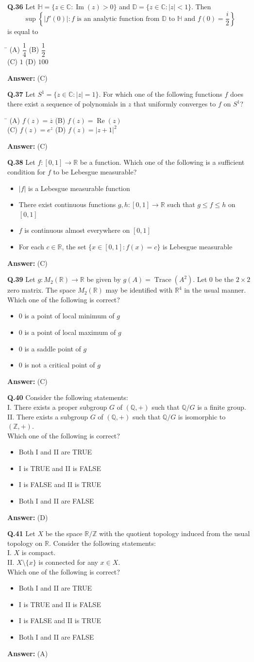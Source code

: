 \documentclass[11pt,a4paper]{article}
\newcommand{\optsfourA}[4]{%
  \begin{tabbing}
    \hspace{0.48\linewidth}\=\kill
    (A) #1 \> (B) #2 \\[2pt]
    (C) #3 \> (D) #4
  \end{tabbing}%
}
\newcommand{\optslistA}[4]{%
  \begin{itemize}
    \setlength{\itemsep}{2pt}\setlength{\parskip}{0pt}
    \item[(A)] #1
    \item[(B)] #2
    \item[(C)] #3
    \item[(D)] #4
  \end{itemize}%
}
\newcommand{\ans}[1]{\textbf{Answer:} #1\par\medskip}
\begin{document}
\textbf{Q.36} Let $\mathbb{H} = \{z \in \mathbb{C} : \operatorname{Im}(z) > 0\}$ and $\mathbb{D} = \{z \in \mathbb{C} : |z| < 1\}$. Then
\[
  \sup\left\{|f'(0)| : f \text{ is an analytic function from } \mathbb{D} \text{ to } \mathbb{H} \text{ and } f(0) = \frac{i}{2}\right\}
\]
is equal to
\optsfourA{$\dfrac{1}{4}$}{$\dfrac{1}{2}$}{$1$}{$100$}
\ans{(C)}

\textbf{Q.37} Let $S^1 = \{z \in \mathbb{C} : |z| = 1\}$. For which one of the following functions $f$ does there exist a sequence of polynomials in $z$ that uniformly converges to $f$ on $S^1$?
\optsfourA{$f(z) = \overline{z}$}{$f(z) = \operatorname{Re}(z)$}{$f(z) = e^z$}{$f(z) = |z + 1|^2$}
\ans{(C)}

\textbf{Q.38} Let $f : [0, 1] \to \mathbb{R}$ be a function. Which one of the following is a sufficient condition for $f$ to be Lebesgue measurable?
\optslistA{$|f|$ is a Lebesgue measurable function}{There exist continuous functions $g, h : [0, 1] \to \mathbb{R}$ such that $g \le f \le h$ on $[0, 1]$}{$f$ is continuous almost everywhere on $[0, 1]$}{For each $c \in \mathbb{R}$, the set $\{x \in [0, 1] : f(x) = c\}$ is Lebesgue measurable}
\ans{(C)}

\textbf{Q.39} Let $g : M_2(\mathbb{R}) \to \mathbb{R}$ be given by $g(A) = \operatorname{Trace}(A^2)$. Let $0$ be the $2 \times 2$ zero matrix. The space $M_2(\mathbb{R})$ may be identified with $\mathbb{R}^4$ in the usual manner. Which one of the following is correct?
\optslistA{$0$ is a point of local minimum of $g$}{$0$ is a point of local maximum of $g$}{$0$ is a saddle point of $g$}{$0$ is not a critical point of $g$}
\ans{(C)}

\textbf{Q.40} Consider the following statements:\\
I. There exists a proper subgroup $G$ of $(\mathbb{Q}, +)$ such that $\mathbb{Q}/G$ is a finite group.\\
II. There exists a subgroup $G$ of $(\mathbb{Q}, +)$ such that $\mathbb{Q}/G$ is isomorphic to $(\mathbb{Z}, +)$.\\
Which one of the following is correct?
\optslistA{Both I and II are TRUE}{I is TRUE and II is FALSE}{I is FALSE and II is TRUE}{Both I and II are FALSE}
\ans{(D)}

\textbf{Q.41} Let $X$ be the space $\mathbb{R}/\mathbb{Z}$ with the quotient topology induced from the usual topology on $\mathbb{R}$. Consider the following statements:\\
I. $X$ is compact.\\
II. $X \setminus \{x\}$ is connected for any $x \in X$.\\
Which one of the following is correct?
\optslistA{Both I and II are TRUE}{I is TRUE and II is FALSE}{I is FALSE and II is TRUE}{Both I and II are FALSE}
\ans{(A)}
\end{document}
